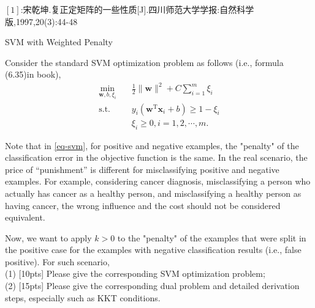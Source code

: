 \documentclass[11pt, a4paper, UTF8]{ctexart}
\begin{document}
\begin{remark}
	$[1]$:宋乾坤.复正定矩阵的一些性质[J].四川师范大学学报:自然科学版,1997,20(3):44-48
\end{remark}




\begin{problem}[ML problem 2]
	[25pts] SVM with Weighted Penalty
	
 Consider the standard SVM optimization problem as follows (i.e., formula (6.35)in book),
\begin{equation}
\label{eq-svm}
\begin{split}
\min_{\mathbf{w},b,\xi_i}& \quad \frac{1}{2} \lVert \mathbf{w} \rVert^2 + C\sum_{i=1}^m\xi_i\\
\text{s.t.}&  \quad y_i(\mathbf{w}^\mathrm{T}\mathbf{x}_i + b)\geq 1-\xi_i\\
& \quad \xi_i \geq 0, i = 1,2,\cdots,m.
\end{split}
\end{equation}

Note that in \eqref{eq-svm}, for positive and negative examples, the "penalty" of the classification error in the objective function is the same. In the real scenario, the price of “punishment” is different for misclassifying positive and negative examples. For example, considering cancer diagnosis, misclassifying a person who actually has cancer as a healthy person, and misclassifying a healthy person as having cancer, the wrong influence and the cost should not be considered equivalent.

Now, we want to apply $k>0$ to the "penalty" of the examples that were split in the positive case for the examples with negative classification results (i.e., false positive). For such scenario,\\
(1) [10pts] Please give the corresponding SVM optimization problem;\\
(2) [15pts] Please give the corresponding dual problem and detailed derivation steps, especially such as KKT conditions.


\end{problem}
\end{document}
